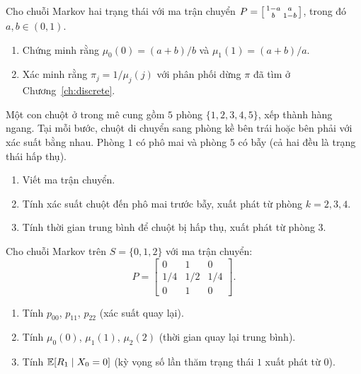\begin{exercise}
Cho chuỗi Markov hai trạng thái với ma trận chuyển
$P = \begin{bsmallmatrix} 1-a & a \\ b & 1-b \end{bsmallmatrix}$,
trong đó $a, b \in (0,1)$.
\begin{enumerate}[label=(\alph*)]
  \item Chứng minh rằng $\mu_0(0) = (a+b)/b$ và $\mu_1(1) = (a+b)/a$.
  \item Xác minh rằng $\pi_j = 1/\mu_j(j)$ với phân phối dừng $\pi$ đã tìm ở Chương~\ref{ch:discrete}.
\end{enumerate}
\end{exercise}

\begin{exercise}
Một con chuột ở trong mê cung gồm $5$ phòng $\{1, 2, 3, 4, 5\}$, xếp thành hàng ngang.
Tại mỗi bước, chuột di chuyển sang phòng kề bên trái hoặc bên phải với xác suất bằng nhau.
Phòng $1$ có phô mai và phòng $5$ có bẫy (cả hai đều là trạng thái hấp thụ).
\begin{enumerate}[label=(\alph*)]
  \item Viết ma trận chuyển.
  \item Tính xác suất chuột đến phô mai trước bẫy, xuất phát từ phòng $k = 2, 3, 4$.
  \item Tính thời gian trung bình để chuột bị hấp thụ, xuất phát từ phòng $3$.
\end{enumerate}
\end{exercise}

\begin{exercise}
Cho chuỗi Markov trên $S = \{0, 1, 2\}$ với ma trận chuyển:
\[
  P = \begin{bmatrix}
    0 & 1 & 0\\
    1/4 & 1/2 & 1/4\\
    0 & 1 & 0
  \end{bmatrix}.
\]
\begin{enumerate}[label=(\alph*)]
  \item Tính $p_{00}$, $p_{11}$, $p_{22}$ (xác suất quay lại).
  \item Tính $\mu_0(0)$, $\mu_1(1)$, $\mu_2(2)$ (thời gian quay lại trung bình).
  \item Tính $\mathbb{E}[R_1 \mid X_0 = 0]$ (kỳ vọng số lần thăm trạng thái $1$ xuất phát từ $0$).
\end{enumerate}
\end{exercise}

